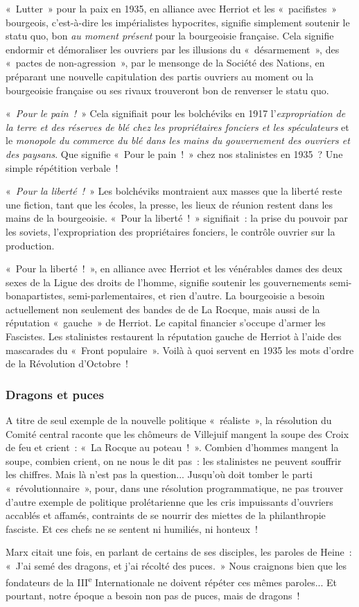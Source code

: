 \documentclass[french,twoside]{book} %
\begin{document}
« Lutter » pour la paix en 1935, en alliance avec Herriot et les « pacifistes » bourgeois, c’est-à-dire les impérialistes hypocrites, signifie simplement soutenir le statu quo, bon \emph{au moment présent} pour la bourgeoisie  française. Cela signifie endormir et démoraliser les ouvriers par les illusions du « désarmement », des « pactes de non-agression », par le mensonge de la Société des Nations, en préparant une nouvelle capitulation des partis ouvriers au moment ou la bourgeoisie française ou ses rivaux trouveront bon de renverser le statu quo.\par
« \emph{Pour le pain !} » Cela signifiait pour les bolchéviks en 1917 l’\emph{expropriation de la terre et des réserves de blé chez les propriétaires fonciers et les spéculateurs} et le \emph{monopole du commerce du blé dans les mains du gouvernement des ouvriers et des paysans}. Que signifie « Pour le pain ! » chez nos stalinistes en 1935 ? Une simple répétition verbale !\par
« \emph{Pour la liberté !} » Les bolchéviks montraient aux masses que la liberté reste une fiction, tant que les écoles, la presse, les lieux de réunion restent dans les mains de la bourgeoisie. « Pour la liberté ! » signifiait : la prise du pouvoir par les soviets, l’expropriation des propriétaires fonciers, le contrôle ouvrier sur la production.\par
« Pour la liberté ! », en alliance avec Herriot et les vénérables dames des deux sexes de la Ligue des droits de l’homme, signifie soutenir les gouvernements semi-bonapartistes, semi-parlementaires, et rien d’autre. La bourgeoisie a besoin actuellement non seulement des bandes de de La Rocque, mais aussi de la réputation « gauche » de Herriot. Le capital financier s’occupe d’armer les Fascistes. Les stalinistes restaurent la réputation gauche de Herriot à l’aide des mascarades du « Front populaire ». Voilà à quoi servent en 1935 les mots d’ordre de la Révolution d’Octobre !
\subsubsection[{Dragons et puces}]{Dragons et puces}
\noindent A titre de seul exemple de la nouvelle politique « réaliste », la résolution du Comité central raconte que les  chômeurs de Villejuif mangent la soupe des Croix de feu et crient : « La Rocque au poteau ! ». Combien d’hommes mangent la soupe, combien crient, on ne nous le dit pas : les stalinistes ne peuvent souffrir les chiffres. Mais là n’est pas la question... Jusqu’où doit tomber le parti « révolutionnaire », pour, dans une résolution programmatique, ne pas trouver d’autre exemple de politique prolétarienne que les cris impuissants d’ouvriers accablés et affamés, contraints de se nourrir des miettes de la philanthropie fasciste. Et ces chefs ne se sentent ni humiliés, ni honteux !\par
Marx citait une fois, en parlant de certains de ses disciples, les paroles de Heine : « J’ai semé des dragons, et j’ai récolté des puces. » Nous craignons bien que les fondateurs de la III\textsuperscript{e} Internationale ne doivent répéter ces mêmes paroles... Et pourtant, notre époque a besoin non pas de puces, mais de dragons !
\end{document}
